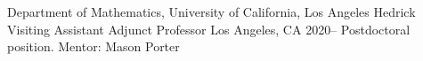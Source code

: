 

\begin{cventries}

\cventry
{Department of Mathematics, University of California, Los Angeles} %
{Hedrick Visiting Assistant Adjunct Professor} %
{Los Angeles, CA} %
{2020--} %
{Postdoctoral position. Mentor: Mason Porter}
\end{cventries}